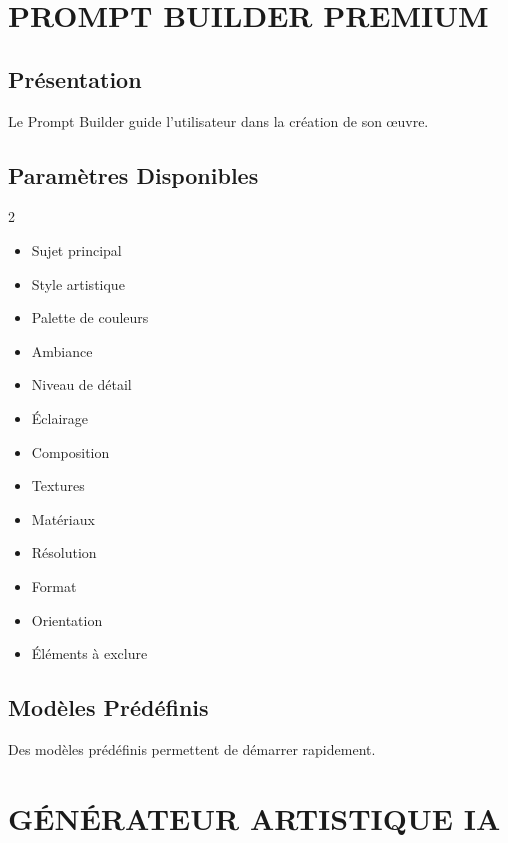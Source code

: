 \documentclass[12pt,a4paper,oneside]{book}
\begin{document}
\chapter{PROMPT BUILDER PREMIUM}

\section{Présentation}
Le Prompt Builder guide l'utilisateur dans la création de son œuvre.

\section{Paramètres Disponibles}
\begin{multicols}{2}
\begin{itemize}
\item Sujet principal
\item Style artistique
\item Palette de couleurs
\item Ambiance
\item Niveau de détail
\item Éclairage
\item Composition
\item Textures
\item Matériaux
\item Résolution
\item Format
\item Orientation
\item Éléments à exclure
\end{itemize}
\end{multicols}

\section{Modèles Prédéfinis}
Des modèles prédéfinis permettent de démarrer rapidement.

\chapter{GÉNÉRATEUR ARTISTIQUE IA}
\end{document}
